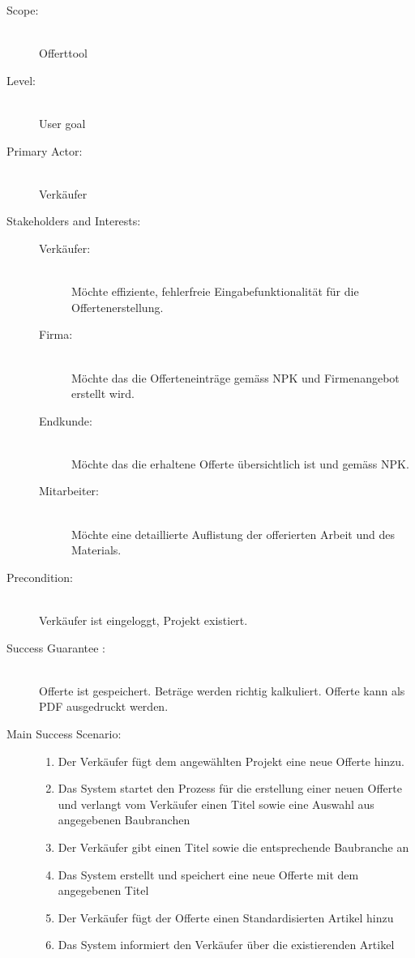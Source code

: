 \documentclass[a4paper,12pt]{article}
\begin{document}
	\begin{description}
		\item[Scope:] \hfill  \\Offerttool
		\item[Level:] \hfill \\User goal
		\item[Primary Actor:] \hfill \\Verkäufer
		\item[Stakeholders and Interests:] \hfill 
		\begin{description}
			\item[Verkäufer:]\hfill \\Möchte effiziente, fehlerfreie Eingabefunktionalität 
			für die Offertenerstellung.
			\item[Firma:]\hfill \\Möchte das die Offerteneinträge gemäss 
			NPK und Firmenangebot erstellt wird.
			\item[Endkunde:]\hfill \\Möchte das die erhaltene Offerte 
			übersichtlich ist und gemäss NPK.
			\item[Mitarbeiter:]\hfill \\Möchte eine detaillierte Auflistung der
			offerierten Arbeit und des Materials.  
		\end{description}
		\item[Precondition:] \hfill \\Verkäufer ist eingeloggt, Projekt existiert. 
		\item[Success Guarantee :] \hfill \\Offerte ist gespeichert. Beträge
		werden richtig kalkuliert. Offerte kann als PDF ausgedruckt werden. 
		\item[Main Success Scenario:] \hfill  
		\begin{enumerate}
			\item Der Verkäufer fügt dem angewählten Projekt eine neue Offerte hinzu.
			\item Das System startet den Prozess für die erstellung einer neuen Offerte und
			verlangt vom Verkäufer einen Titel sowie eine Auswahl aus angegebenen Baubranchen
			\item Der Verkäufer gibt einen Titel sowie die entsprechende Baubranche an
			\item Das System erstellt und speichert eine neue Offerte mit dem 
				angegebenen Titel
			\item Der Verkäufer fügt der Offerte einen Standardisierten Artikel hinzu
			\item Das System informiert den Verkäufer über die existierenden Artikel

\end{enumerate}
\end{description}
\end{document}
